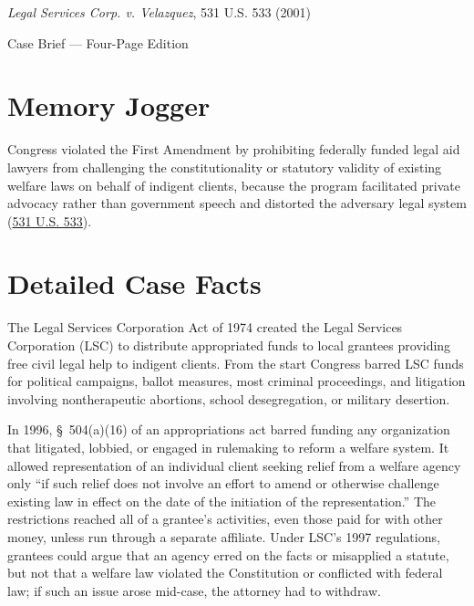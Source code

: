 \documentclass[12pt]{article}
\begin{document}
\begin{center}
{\LARGE \textit{Legal Services Corp. v. Velazquez}, 531 U.S. 533 (2001)\par}
\vspace{0.8em}
{\large Case Brief --- Four-Page Edition\par}
\end{center}
\vspace{1em}

\section{Memory Jogger}

Congress violated the First Amendment by prohibiting federally funded legal aid lawyers from challenging the constitutionality or statutory validity of existing welfare laws on behalf of indigent clients, because the program facilitated private advocacy rather than government speech and distorted the adversary legal system (\href{https://supreme.justia.com/cases/federal/us/531/533/}{531 U.S. 533}).

\section{Detailed Case Facts}

The Legal Services Corporation Act of 1974 created the Legal Services Corporation (LSC) to distribute appropriated funds to local grantees providing free civil legal help to indigent clients. From the start Congress barred LSC funds for political campaigns, ballot measures, most criminal proceedings, and litigation involving nontherapeutic abortions, school desegregation, or military desertion.

In 1996, \S~504(a)(16) of an appropriations act barred funding any organization that litigated, lobbied, or engaged in rulemaking to reform a welfare system. It allowed representation of an individual client seeking relief from a welfare agency only ``if such relief does not involve an effort to amend or otherwise challenge existing law in effect on the date of the initiation of the representation.'' The restrictions reached all of a grantee's activities, even those paid for with other money, unless run through a separate affiliate. Under LSC's 1997 regulations, grantees could argue that an agency erred on the facts or misapplied a statute, but not that a welfare law violated the Constitution or conflicted with federal law; if such an issue arose mid-case, the attorney had to withdraw.
\end{document}

